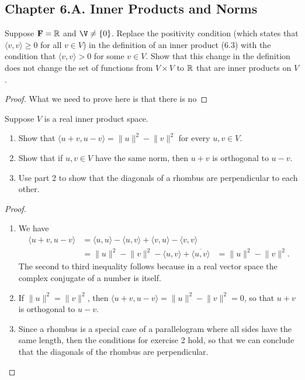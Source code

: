 \subsection*{Chapter 6.A. Inner Products and Norms}


\begin{exercise}{3}
  Suppose $\mathbf{F}=\mathbb{R}$ and $\V\neq\set{0}$. Replace the positivity condition (which states that $\langle v, v\rangle\geq 0$ for all $v\in V$) in the definition of an inner product (6.3) with the condition that $\langle v, v\rangle>0$ for some $v\in V$. Show that this change in the definition does not change the set of functions from $V\times V$ to $\mathbb{R}$ that are inner products on $V$.
\end{exercise}
\begin{proof}
 What we need to prove here is that there is no
\end{proof}

\begin{exercise}{4}
  Suppose $V$ is a real inner product space.
    \begin{enumerate}
        \item Show that $\langle u+v,u-v\rangle=\lVert u\rVert^2-\lVert v\rVert^2$ for every $u,v\in V$.
        \item Show that if $u,v\in V$ have the same norm, then $u+v$ is orthogonal to $u-v$.
        \item Use part 2 to show that the diagonals of a rhombus are perpendicular to each other.
    \end{enumerate}  
\end{exercise}
\begin{proof}
 \begin{enumerate}
     \item We have 
     \begin{align*}
        \langle u+v,u-v\rangle &= \langle u,u\rangle-\langle u,v\rangle+\langle v,u\rangle-\langle v,v\rangle\\
        &= \lVert u\rVert^2-\lVert v\rVert^2 -\langle u,v\rangle+\overline{\langle u,v\rangle}
        &= \lVert u\rVert^2-\lVert v\rVert^2.
     \end{align*}
     The second to third inequality follows because in a real vector space the complex conjugate of a number is itself.
     \item If $\lVert u\rVert^2=\lVert v\rVert^2$, then $\langle u+v,u-v\rangle=\lVert u\rVert^2-\lVert v\rVert^2=0$, so that $u+v$ is orthogonal to $u-v$.
     \item Since a rhombus is a special case of a parallelogram where all sides have the same length, then the conditions for exercise 2 hold, so that we can conclude that the diagonals of the rhombus are perpendicular.
 \end{enumerate}
\end{proof}

